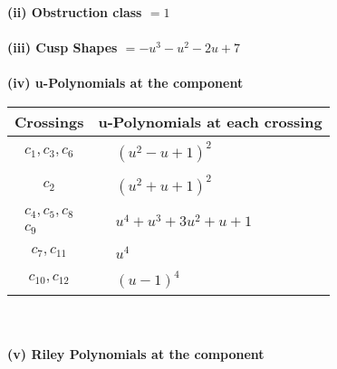 \documentclass[1p]{elsarticle_modified}
\theoremstyle{definition}
\begin{document}
\flushleft \textbf{(ii) Obstruction class $= 1$}\\~\\
\flushleft \textbf{(iii) Cusp Shapes $= - u^3- u^2-2 u+7$}\\~\\
\newpage\renewcommand{\arraystretch}{1}
\flushleft \textbf{(iv) u-Polynomials at the component}\newline \\
\begin{tabular}{m{50pt}|m{274pt}}
Crossings & \hspace{64pt}u-Polynomials at each crossing \\
\hline $$\begin{aligned}c_{1},c_{3},c_{6}\end{aligned}$$&$\begin{aligned}
&(u^2- u+1)^2
\end{aligned}$\\
\hline $$\begin{aligned}c_{2}\end{aligned}$$&$\begin{aligned}
&(u^2+u+1)^2
\end{aligned}$\\
\hline $$\begin{aligned}c_{4},c_{5},c_{8}\\c_{9}\end{aligned}$$&$\begin{aligned}
&u^4+u^3+3 u^2+u+1
\end{aligned}$\\
\hline $$\begin{aligned}c_{7},c_{11}\end{aligned}$$&$\begin{aligned}
&u^4
\end{aligned}$\\
\hline $$\begin{aligned}c_{10},c_{12}\end{aligned}$$&$\begin{aligned}
&(u-1)^4
\end{aligned}$\\
\hline
\end{tabular}\\~\\
\newpage\renewcommand{\arraystretch}{1}
\flushleft \textbf{(v) Riley Polynomials at the component}\newline \\
\end{document}
